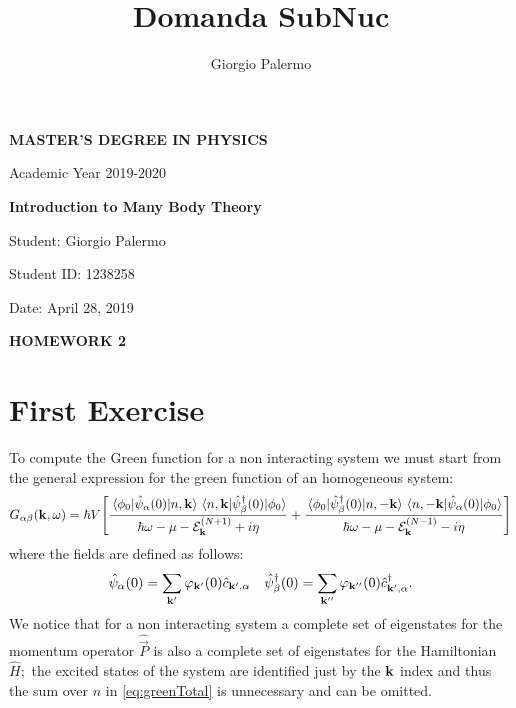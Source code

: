 \documentclass[a4paper]{article}
\title{Domanda SubNuc}
\author{Giorgio Palermo}
\begin{document}
\hypersetup{linkcolor = black}
\hypersetup{linkcolor = blue}

\begin{center}
    \textbf{MASTER'S DEGREE IN PHYSICS}
    
    Academic Year 2019-2020
    
    \medskip
    \textbf{Introduction to Many Body Theory}
\end{center}

\vspace{0.8cm}
Student: Giorgio Palermo

Student ID: 1238258

Date: April 28, 2019

\bigskip

\begin{center}
\textbf{HOMEWORK 2}
\end{center}

\section*{First Exercise}
\noindent To compute the Green function for a non interacting system we must start from the general expression for the green function of an homogeneous system:
\begin{align}
G_{\alpha\beta}(\vb{k},\omega) = \hbar V \bqty{\frac{\mel{\phi_0}{\hat{\psi}_\alpha(0)}{n,\vb{k}}\mel{n,\vb{k}}{\hat{\psi}^\dag_\beta(0)}{\phi_0}}{\hbar \omega -\mu -\mathcal{E}_{\vb{k}}^{(N+1)}+i\eta} + 
\frac{\mel{\phi_0}{\hat{\psi}^\dag_\beta(0)}{n,-\vb{k}}\mel{n,-\vb{k}}{\hat{\psi}_\alpha(0)}{\phi_0}}{\hbar \omega -\mu - \mathcal{E}_{\vb{k}}^{(N-1)} -i\eta}}
\label{eq:greenTotal}
\end{align}
where the fields are defined as follows:
\begin{align}
&\hat{\psi}_\alpha(0) = \sum_{\vb{k}'} \varphi_{\vb{k}'}(0)\hat{c}_{\vb{k}',\alpha} 
&\hat{\psi}^\dag_\beta(0)= \sum_{\vb{k}''} \varphi_{\vb{k}''}(0)\hat{c}^\dag_{\vb{k}',\alpha}.
\end{align}
We notice that for a non interacting system a complete set of eigenstates for the momentum operator $\hat{\vec{P}}$ is also a complete set of eigenstates for the Hamiltonian $\hat{H};$ the excited states of the system are identified just by the $\vb{k}$ index and thus the sum over $n$ in \eqref{eq:greenTotal} is unnecessary and can be omitted.
\end{document}
